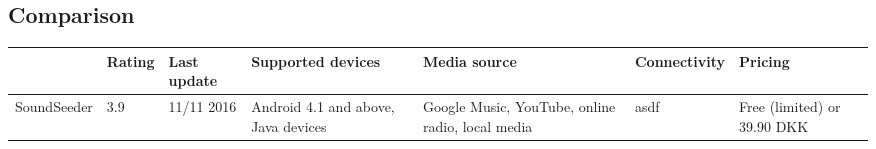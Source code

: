 \subsection{Comparison}

\begin{tabular}{l|l|l|p{2.5cm}|p{2.5cm}|p{2.5cm}|p{2.5cm}|}
                & Rating    & Last update   & Supported devices & Media source & Connectivity & Pricing  \\
    \toprule
    SoundSeeder & 3.9       & 11/11 2016    & Android 4.1 and above, Java devices & Google Music, YouTube, online radio, local media & asdf & Free (limited) or 39.90 DKK \\
\end{tabular}

